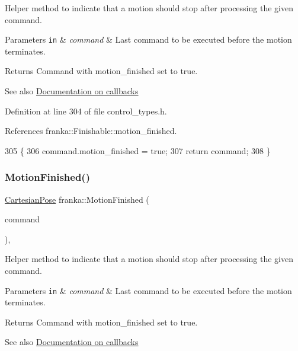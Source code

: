 Helper method to indicate that a motion should stop after processing the given command.


\begin{DoxyParams}[1]{Parameters}
\mbox{\tt in}  & {\em command} & Last command to be executed before the motion terminates.\\
\hline
\end{DoxyParams}
\begin{DoxyReturn}{Returns}
Command with motion\+\_\+finished set to true.
\end{DoxyReturn}
\begin{DoxySeeAlso}{See also}
\hyperlink{classfranka_1_1Robot_callback-docs}{Documentation on callbacks} 
\end{DoxySeeAlso}


Definition at line 304 of file control\+\_\+types.\+h.



References franka\+::\+Finishable\+::motion\+\_\+finished.


\begin{DoxyCode}
305                                       \{
306   command.motion\_finished = \textcolor{keyword}{true};
307   \textcolor{keywordflow}{return} command;
308 \}
\end{DoxyCode}
\mbox{\label{namespacefranka_ab0b308e2a9348fd3eb5fd1d08db12dcf}} 
\subsubsection{\texorpdfstring{Motion\+Finished()}{MotionFinished()}\hspace{0.1cm}{\footnotesize\ttfamily [4/5]}}
{\footnotesize\ttfamily \hyperlink{classfranka_1_1CartesianPose}{Cartesian\+Pose} franka\+::\+Motion\+Finished (\begin{DoxyParamCaption}\item[{\hyperlink{classfranka_1_1CartesianPose}{Cartesian\+Pose}}]{command }\end{DoxyParamCaption})\hspace{0.3cm}{\ttfamily [inline]}, {\ttfamily [noexcept]}}

Helper method to indicate that a motion should stop after processing the given command.


\begin{DoxyParams}[1]{Parameters}
\mbox{\tt in}  & {\em command} & Last command to be executed before the motion terminates.\\
\hline
\end{DoxyParams}
\begin{DoxyReturn}{Returns}
Command with motion\+\_\+finished set to true.
\end{DoxyReturn}
\begin{DoxySeeAlso}{See also}
\hyperlink{classfranka_1_1Robot_callback-docs}{Documentation on callbacks} 
\end{DoxySeeAlso}


